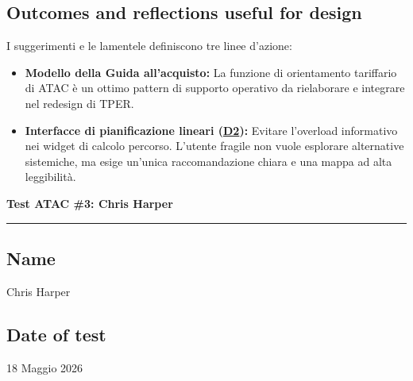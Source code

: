 \documentclass[11pt,a4paper]{article}
\begin{document}
\subsection*{Outcomes and reflections useful for design}
\begin{tcolorbox}[colback=backgroundColor,colframe=borderColor,arc=2mm]
\noindent I suggerimenti e le lamentele definiscono tre linee d'azione:
\begin{itemize}[leftmargin=*]
    \item \textbf{Modello della Guida all'acquisto:} La funzione di orientamento tariffario di ATAC è un ottimo pattern di supporto operativo da rielaborare e integrare nel redesign di TPER.
    \item \textbf{Interfacce di pianificazione lineari (\hyperref[atac:D2]{D2}):} Evitare l'overload informativo nei widget di calcolo percorso. L'utente fragile non vuole esplorare alternative sistemiche, ma esige un'unica raccomandazione chiara e una mappa ad alta leggibilità.
\end{itemize}
\end{tcolorbox}


\newpage
\begin{center}
  {\color{secondaryColor}\large\bfseries
  Test ATAC \#3: Chris Harper}\\
  \vspace{0.1cm}
  \color{borderColor}\hrule
\end{center}

\vspace{0.5cm}

\subsection*{Name}
\begin{tcolorbox}[colback=backgroundColor,colframe=borderColor,arc=2mm]
Chris Harper
\end{tcolorbox}

\subsection*{Date of test}
\begin{tcolorbox}[colback=backgroundColor,colframe=borderColor,arc=2mm]
18 Maggio 2026
\end{tcolorbox}
\end{document}
